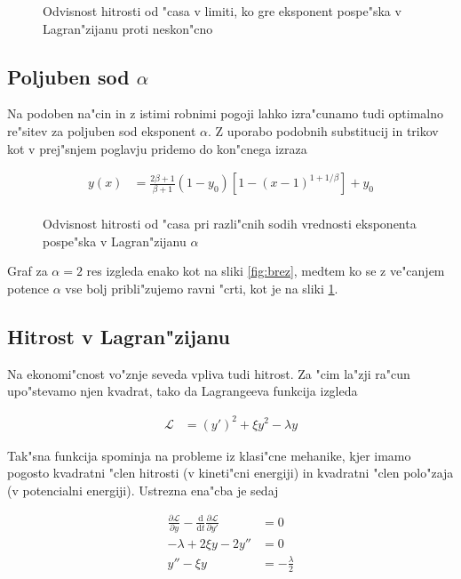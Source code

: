\documentclass[12pt]{article}
\newcommand{\dd}{\mathrm{d}}
\begin{document}
\begin{figure}[h!]

\caption{Odvisnost hitrosti od "casa v limiti, ko gre eksponent pospe"ska v Lagran"zijanu proti neskon"cno} 
\label{fig:eksponent}
\end{figure}

\clearpage

\subsection{Poljuben sod $\alpha$}
Na podoben na"cin in z istimi robnimi pogoji lahko izra"cunamo tudi optimalno re"sitev za poljuben sod eksponent $\alpha$. Z uporabo podobnih substitucij in trikov kot v prej"snjem poglavju pridemo do kon"cnega izraza

\begin{align}
  y(x) &= \frac{2\beta+1}{\beta+1}(1-y_0)\left[ 1 - (x-1)^{1+1/\beta} \right] + y_0 \\
\end{align}

\begin{figure}[h!]

\caption{Odvisnost hitrosti od "casa pri razli"cnih sodih vrednosti eksponenta pospe"ska v Lagran"zijanu $\alpha$} 
\label{fig:poljuben-sod}
\end{figure}

Graf za $\alpha=2$ res izgleda enako kot na sliki \ref{fig:brez}, medtem ko se z ve"canjem potence $\alpha$ vse bolj pribli"zujemo ravni "crti, kot je na sliki \ref{fig:eksponent}. 

\clearpage

\subsection{Hitrost v Lagran"zijanu}

Na ekonomi"cnost vo"znje seveda vpliva tudi hitrost. Za "cim la"zji ra"cun upo"stevamo njen kvadrat, tako da Lagrangeeva funkcija izgleda 

\begin{align}
  \mathcal L &= (y')^2 + \xi y^2 - \lambda y
\end{align}

Tak"sna funkcija spominja na probleme iz klasi"cne mehanike, kjer imamo pogosto kvadratni "clen hitrosti (v kineti"cni energiji) in kvadratni "clen polo"zaja (v potencialni energiji). Ustrezna ena"cba je sedaj

\begin{align}
  \frac{\partial \mathcal{L}}{\partial y} - \frac{\dd}{\dd t}\frac{\partial \mathcal L}{\partial y'} &= 0 \\
-\lambda + 2\xi y - 2y'' &= 0 \\
y'' - \xi y &= -\frac{\lambda}{2}
\end{align}
\end{document}
